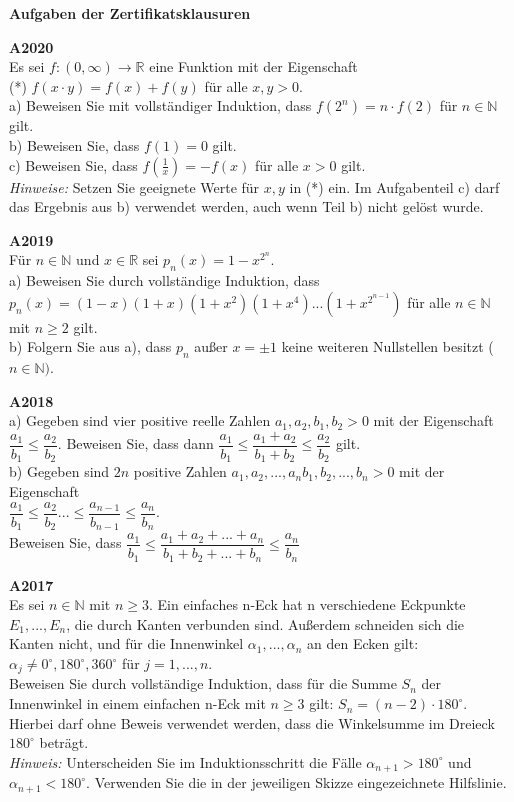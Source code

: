 \documentclass[landscape,twocolumn,a4paper]{article}
\begin{document}
\parindent 0mm


\textbf{Aufgaben der Zertifikatsklausuren}
\bigskip 

\textbf{A2020} \\
Es sei $f: (0,\infty) \rightarrow \mathbb{R}$ eine Funktion mit der Eigenschaft \\
(*) \quad $f(x\cdot y) = f(x) + f(y)$ für alle $x,y > 0$. \\
a) Beweisen Sie mit vollständiger Induktion, dass $f(2^n) = n \cdot f(2)$ für $n \in \mathbb{N}$ gilt. \\
b) Beweisen Sie, dass $f(1) = 0$ gilt. \\
c) Beweisen Sie, dass $f(\frac{1}{x}) = -f(x)$ für alle $x > 0$ gilt. \\

\textit{Hinweise:} Setzen Sie geeignete Werte für $x,y$ in (*) ein. Im Aufgabenteil c) darf das Ergebnis aus b)
verwendet werden, auch wenn Teil b) nicht gelöst wurde.
\bigskip

\textbf{A2019} \\
Für $n \in \mathbb{N}$ und $x \in \mathbb{R}$ sei $p_n(x) = 1 - x^{2^n}$. \\
a) Beweisen Sie durch vollständige Induktion, dass \\
$p_n(x) = (1-x)(1+x)(1+x^2)(1+x^4)...(1+x^{2^{n-1}})$ für alle $n \in \mathbb{N}$ mit $n \ge 2$ gilt. \\
b) Folgern Sie aus a), dass $p_n$ außer $x = \pm 1$ keine weiteren Nullstellen besitzt ($n \in \mathbb{N})$.
\bigskip

\textbf{A2018} \\
a) Gegeben sind vier positive reelle Zahlen $a_1, a_2, b_1, b_2 > 0$ mit der Eigenschaft
$\dfrac{a_1}{b_1} \le \dfrac{a_2}{b_2}$. Beweisen Sie, dass dann 
$\dfrac{a_1}{b_1} \le \dfrac{a_1+a_2}{b_1+b_2} \le \dfrac{a_2}{b_2}$ gilt. \\
b) Gegeben sind $2n$ positive Zahlen  $a_1, a_2,...,a_n b_1, b_2,...,b_n > 0$ mit der Eigenschaft \\
$\dfrac{a_1}{b_1} \le \dfrac{a_2}{b_2} ... \le \dfrac{a_{n-1}}{b_{n-1}} \le \dfrac{a_n}{b_n}$. \\
 Beweisen Sie, dass  
$\dfrac{a_1}{b_1} \le \dfrac{a_1+a_2+...+a_n}{b_1+b_2+...+b_n} \le \dfrac{a_n}{b_n}$ 
\bigskip

\newpage

\textbf{A2017} \\
Es sei $n \in \mathbb{N}$ mit $n \ge 3$. Ein einfaches n-Eck hat n verschiedene Eckpunkte $E_1,...,E_n$, die
durch Kanten verbunden sind. Außerdem schneiden sich die Kanten nicht, und für die Innenwinkel 
$\alpha_1,...,\alpha_n$ an den Ecken gilt: $\alpha_j \neq 0^\circ, 180^\circ, 360^\circ$ für $j=1,...,n$. \\
Beweisen Sie durch vollständige Induktion, dass für die Summe $S_n$ der Innenwinkel in einem einfachen
n-Eck mit $n \ge 3$ gilt: $S_n = (n-2) \cdot 180^\circ$. Hierbei darf ohne Beweis verwendet werden,
dass die Winkelsumme im Dreieck $180^\circ$ beträgt. \\
\textit{Hinweis:} Unterscheiden Sie im Induktionsschritt die Fälle $\alpha_{n+1} > 180^\circ$ und
$\alpha_{n+1} < 180^\circ$. Verwenden Sie die in der jeweiligen Skizze eingezeichnete Hilfslinie.
\end{document}
